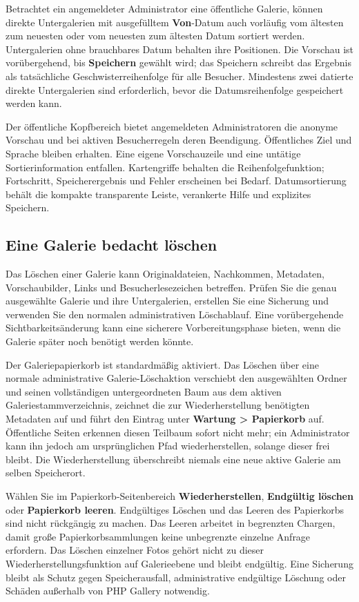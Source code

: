 \documentclass[11pt,a4paper]{article}
\newcommand{\ui}[1]{\textbf{#1}}
\begin{document}
Betrachtet ein angemeldeter Administrator eine öffentliche Galerie, können
direkte Untergalerien mit ausgefülltem \ui{Von}-Datum auch vorläufig vom
ältesten zum neuesten oder vom neuesten zum ältesten Datum sortiert werden.
Untergalerien ohne brauchbares Datum behalten ihre Positionen. Die Vorschau ist
vorübergehend, bis \ui{Speichern} gewählt wird; das Speichern schreibt das
Ergebnis als tatsächliche Geschwisterreihenfolge für alle Besucher. Mindestens
zwei datierte direkte Untergalerien sind erforderlich, bevor die
Datumsreihenfolge gespeichert werden kann.

Der öffentliche Kopfbereich bietet angemeldeten Administratoren die anonyme
Vorschau und bei aktiven Besucherregeln deren Beendigung. Öffentliches Ziel
und Sprache bleiben erhalten. Eine eigene Vorschauzeile und eine untätige
Sortierinformation entfallen. Kartengriffe behalten die Reihenfolgefunktion;
Fortschritt, Speicherergebnis und Fehler erscheinen bei Bedarf. Datumsortierung
behält die kompakte transparente Leiste, verankerte Hilfe und explizites
Speichern.

\subsection{Eine Galerie bedacht löschen}

Das Löschen einer Galerie kann Originaldateien, Nachkommen, Metadaten,
Vorschaubilder, Links und Besucherlesezeichen betreffen. Prüfen Sie die genau
ausgewählte Galerie und ihre Untergalerien, erstellen Sie eine Sicherung und
verwenden Sie den normalen administrativen Löschablauf. Eine vorübergehende
Sichtbarkeitsänderung kann eine sicherere Vorbereitungsphase bieten, wenn die
Galerie später noch benötigt werden könnte.

Der Galeriepapierkorb ist standardmäßig aktiviert. Das Löschen über eine normale
administrative Galerie-Löschaktion verschiebt den ausgewählten Ordner und seinen
vollständigen untergeordneten Baum aus dem aktiven Galeriestammverzeichnis,
zeichnet die zur Wiederherstellung benötigten Metadaten auf und führt den
Eintrag unter \ui{Wartung > Papierkorb} auf. Öffentliche Seiten erkennen diesen
Teilbaum sofort nicht mehr; ein Administrator kann ihn jedoch am ursprünglichen
Pfad wiederherstellen, solange dieser frei bleibt. Die Wiederherstellung
überschreibt niemals eine neue aktive Galerie am selben Speicherort.

Wählen Sie im Papierkorb-Seitenbereich \ui{Wiederherstellen}, \ui{Endgültig
löschen} oder \ui{Papierkorb leeren}. Endgültiges Löschen und das Leeren des
Papierkorbs sind nicht rückgängig zu machen. Das Leeren arbeitet in begrenzten
Chargen, damit große Papierkorbsammlungen keine unbegrenzte einzelne Anfrage
erfordern. Das Löschen einzelner Fotos gehört nicht zu dieser
Wiederherstellungsfunktion auf Galerieebene und bleibt endgültig. Eine Sicherung
bleibt als Schutz gegen Speicherausfall, administrative endgültige Löschung oder
Schäden außerhalb von PHP Gallery notwendig.
\end{document}
